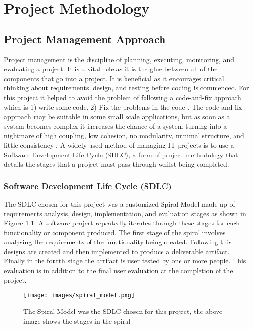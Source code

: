 
\chapter{Project Methodology}\label{C:m}

\section{Project Management Approach}
Project management is the discipline of planning, executing, monitoring, and
evaluating a project. It is a vital role as it is the glue between all of the
 components that go into a project. It is beneficial as it
encourages critical thinking about requirements, design, and testing before coding is
commenced. For this project it helped to avoid the problem of following a
code-and-fix approach which is 1) write some code. 2) Fix the problems in
the code \cite{boehm1988spiral}. The code-and-fix approach may be suitable in some 
small scale applications, but as soon as a system becomes complex it increases
the chance of a system turning into a nightmare of high coupling, low cohesion,
no modularity, minimal structure, and little consistency \cite{foote1997big}.
A widely used method of managing IT projects is to use a Software Development
Life Cycle (SDLC), a form of project methodology that details the stages that a project must pass through whilst being completed.

\subsection{Software Development Life Cycle (SDLC)}
The SDLC chosen for
this project was a customized Spiral Model \cite{boehm1988spiral} made up of
requirements analysis, design, implementation, and evaluation stages as shown in
Figure \ref{fig:spiralModel}. A software project repeatedly iterates through these stages for each functionality or component produced. The first stage of the spiral involves analysing the
requirements of the functionality being created. Following this designs are created and then implemented to produce a deliverable artifact. Finally in the fourth stage the artifact is user tested by one
or more people. This evaluation is in addition to the final user evaluation at the completion of the project. 
\clearpage
\begin{figure}[H]
  \centering
      \texttt{[image: images/spiral\_model.png]}
  \caption[Spiral Model]{The Spiral Model was the SDLC chosen for this project, the above image shows the stages in the spiral}
  \label{fig:spiralModel}
\end{figure}

